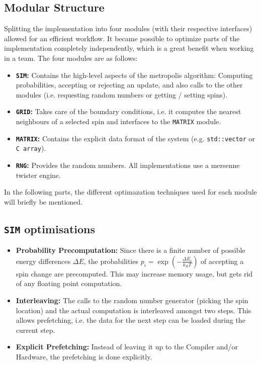 \documentclass[letterpaper]{article}
\begin{document}
\subsection{Modular Structure} Splitting the implementation into four modules (with their respective interfaces) allowed for an efficient workflow. It became possible to optimize parts of the implementation completely independently, which is a great benefit when working in a team. The four modules are as follows:
\begin{itemize}[noitemsep, topsep = 0pt]
\item \textbf{\texttt{SIM}:} Contains the high-level aspects of the metropolis algorithm: Computing probabilities, accepting or rejecting an update, and also calls to the other modules (i.e. requesting random numbers or getting / setting spins).
\item \textbf{\texttt{GRID}:} Takes care of the boundary conditions, i.e. it computes the nearest neighbours of a selected spin and interfaces to the \texttt{MATRIX} module.
\item \textbf{\texttt{MATRIX}:} Contains the explicit data format  of the system (e.g. \texttt{std::vector} or \texttt{C array}).
\item \textbf{\texttt{RNG}:} Provides the random numbers. All implementations use a mersenne twister engine.
\end{itemize}
In the following parts, the different optimazation techniques used for each module will briefly be mentioned.
\subsection{\texttt{SIM} optimisations}\label{opt:sim}
\begin{itemize}[noitemsep, topsep = 0pt]
\item \textbf{Probability Precomputation:} Since there is a finite number of possible energy differences $\Delta E$, the probabilities $p_i = \exp{\left(-\frac{\Delta E_i}{k_B T}\right)}$ of accepting a spin change are precomputed. This may increase memory usage, but gets rid of any floating point computation.
\item \textbf{Interleaving:} The calls to the random number generator (picking the spin location) and the actual computation is interleaved amongst two steps. This allows prefetching, i.e. the data for the next step can be loaded during the current step.
\item \textbf{Explicit Prefetching:} Instead of leaving it up to the Compiler and/or Hardware, the prefetching is done explicitly. 
\end{itemize}
\end{document}
